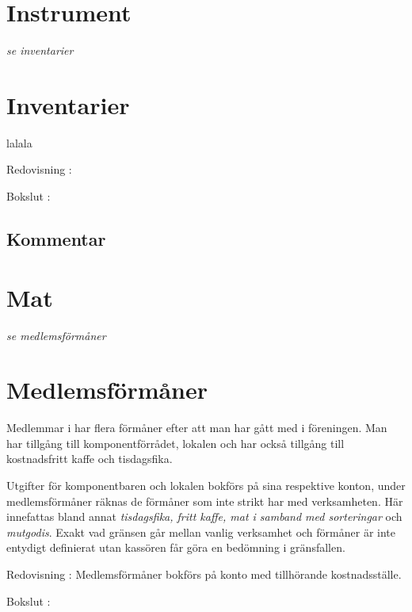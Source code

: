 				\section{Instrument}
				\emph{se inventarier}
			
				\section{Inventarier}
				
				lalala
			
				\begin{redovisning}
					Redovisning : 
				\end{redovisning}
			
				\begin{bokslut}
					Bokslut : 
				\end{bokslut}
			
				\subsection{Kommentar}
				
				\section{Mat}
				\emph{se medlemsförmåner}
			
				\section{Medlemsförmåner}
				
				Medlemmar i  har flera förmåner efter att man har gått med i föreningen. Man har tillgång till komponentförrådet, lokalen och har också tillgång till kostnadsfritt kaffe och tisdagsfika.
		
		Utgifter för komponentbaren och lokalen bokförs på sina respektive konton, under medlemsförmåner räknas de förmåner som inte strikt har med verksamheten. Här innefattas bland annat \emph{tisdagsfika, fritt kaffe, mat i samband med sorteringar} och \emph{mutgodis}. Exakt vad gränsen går mellan vanlig verksamhet och förmåner är inte entydigt definierat utan kassören får göra en bedömning i gränsfallen.
		
			
				\begin{redovisning}
					Redovisning : Medlemsförmåner bokförs på konto  med tillhörande kostnadsställe.
				\end{redovisning}
			
				\begin{bokslut}
					Bokslut : 
				\end{bokslut}
			
